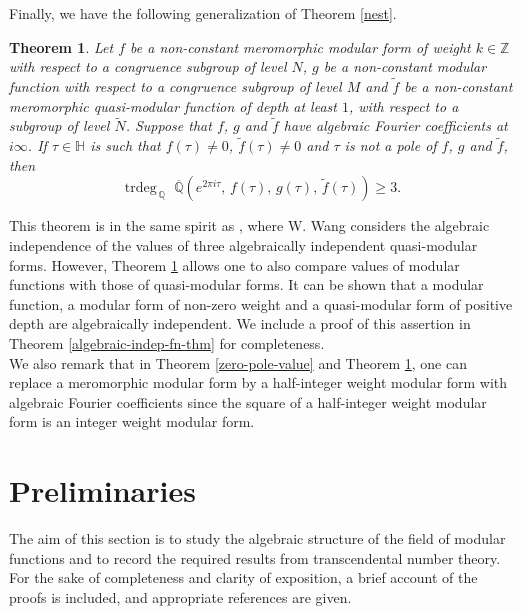 \documentclass[11pt, reqno]{amsart}
\newtheorem{theorem}{Theorem}[section]
\begin{document}
Finally, we have the following generalization of Theorem \ref{nest}. 
\begin{theorem}\label{tr-deg-thm}
Let $f$ be a non-constant meromorphic modular form of weight $k \in \mathbb{Z}$ with respect to a congruence subgroup of level $N$, $g$ be a non-constant modular function with respect to a congruence subgroup of level $M$ and $\widetilde{f}$ be a non-constant meromorphic quasi-modular function of depth at least $1$, with respect to a subgroup of level $\widetilde{N}$. Suppose that $f$, $g$ and $\widetilde{f}$ have algebraic Fourier coefficients at $i\infty$. If $\tau\in\mathbb{H}$ is such that $f(\tau)\neq 0$, $\widetilde{f}(\tau)\neq 0$ and $\tau$ is not a pole of $f$, $g$ and $\widetilde{f}$, then 
    $$
\operatorname{trdeg}_{\,\mathbb{Q}}\,  \,\overline{\mathbb{Q}}\left( e^{2\pi i\tau},\, f(\tau),\, g(\tau),\, \widetilde f(\tau)\right)\geq 3. 
    $$
\end{theorem}
This theorem is in the same spirit as \cite[Theorem 1.2]{wang}, where W. Wang considers the algebraic independence of the values of three algebraically independent quasi-modular forms. However, Theorem \ref{tr-deg-thm} allows one to also compare values of modular functions with those of quasi-modular forms. It can be shown that a modular function, a modular form of non-zero weight and a quasi-modular form of positive depth are algebraically independent. We include a proof of this assertion in Theorem \ref{algebraic-indep-fn-thm} for completeness. \\

\noindent We also remark that in Theorem \ref{zero-pole-value} and Theorem \ref{tr-deg-thm}, one can replace a meromorphic modular form by a half-integer weight modular form with algebraic Fourier coefficients since the square of a half-integer weight modular form is an integer weight modular form.

\bigskip

\section{\bf Preliminaries}
\bigskip

The aim of this section is to study the algebraic structure of the field of modular functions and to record the required results from transcendental number theory. For the sake of completeness and clarity of exposition, a brief account of the proofs is included, and appropriate references are given.
\end{document}
